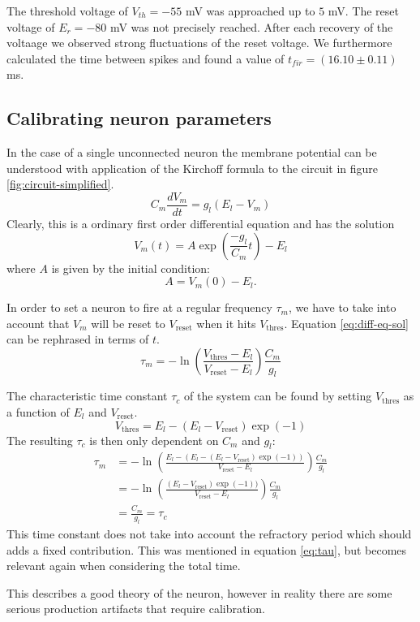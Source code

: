 \documentclass[a4paper,twocolumn]{article}
\begin{document}
The threshold voltage of $V_{th} = -55$ mV was approached up to $5$ mV.  The 
reset voltage of $E_r = -80$ mV was not precisely reached.  After each recovery 
of the voltaage we observed strong fluctuations of the reset voltage.  We 
furthermore calculated the time between spikes and found a value of 
$t_{fir} = (16.10\pm 0.11)$ ms.
\subsection{Calibrating neuron parameters}

In the case of a single unconnected neuron the membrane potential can be
understood with application of the Kirchoff formula to the circuit in figure
\ref{fig:circuit-simplified}.
\[
    C_m \frac{dV_m}{dt} = g_l(E_l - V_m)
\]
Clearly, this is a ordinary first order differential equation and has the
solution
\begin{equation}
    V_m(t) = A \exp(\frac{-g_l}{C_m}t) - E_l
    \label{eq:diff-eq-sol}
\end{equation}
where $A$ is given by the initial condition:
\[
    A = V_m(0) - E_l.
\]

In order to set a neuron to fire at a regular frequency $\tau_m$, we have to take
into account that $V_m$ will be reset to $V_\text{reset}$ when it hits
$V_\text{thres}$. Equation \eqref{eq:diff-eq-sol} can be rephrased in terms of
$t$.
\[
    \tau_m = -\ln(\frac{V_\text{thres} - E_l}{V_\text{reset} - E_l})
    \frac{C_m}{g_l}
\]

The characteristic time constant $\tau_c$ of the system can be found by setting
$V_\text{thres}$ as a function of $E_l$ and $V_\text{reset}$.
\[
    V_\text{thres} = E_l - (E_l - V_\text{reset})\exp(-1)
\]
The resulting $\tau_c$ is then only dependent on $C_m$ and $g_l$:
\begin{align*}
    \tau_m &= -\ln(\frac{E_l - (E_l - (E_l - V_\text{reset})\exp(-1))}{V_\text{reset} - E_l}) \frac{C_m}{g_l}\\
           &= -\ln(\frac{(E_l - V_\text{reset})\exp(-1))}{V_\text{reset} - E_l})\frac{C_m}{g_l} \\
           &= \frac{C_m}{g_l} = \tau_c
\end{align*}
This time constant does not take into account the refractory period which should
adds a fixed contribution. This was mentioned in equation \eqref{eq:tau}, but
becomes relevant again when considering the total time.

This describes a good theory of the neuron, however in reality there are some
serious production artifacts that require calibration.
\end{document}
